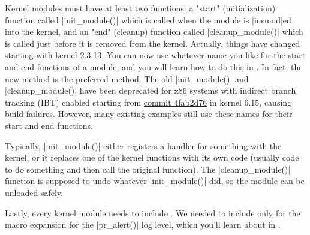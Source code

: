 \documentclass[10pt, oneside]{book}
\begin{document}
Kernel modules must have at least two functions: a "start" (initialization) function called \cpp|init_module()| which is called when the module is \sh|insmod|ed into the kernel,
and an "end" (cleanup) function called \cpp|cleanup_module()| which is called just before it is removed from the kernel.
Actually, things have changed starting with kernel 2.3.13.
You can now use whatever name you like for the start and end functions of a module,
and you will learn how to do this in .
In fact, the new method is the preferred method.
The old \cpp|init_module()| and \cpp|cleanup_module()| have been deprecated for x86 systems with indirect branch tracking (IBT) enabled starting from \href{https://github.com/torvalds/linux/commit/4fab2d76}{commit 4fab2d76} in kernel 6.15, causing build failures.
However, many existing examples still use these names for their start and end functions.

Typically, \cpp|init_module()| either registers a handler for something with the kernel, 
or it replaces one of the kernel functions with its own code (usually code to do something and then call the original function).
The \cpp|cleanup_module()| function is supposed to undo whatever \cpp|init_module()| did, so the module can be unloaded safely.

Lastly, every kernel module needs to include .
We needed to include  only for the macro expansion for the \cpp|pr_alert()| log level, which you'll learn about in .
\end{document}
